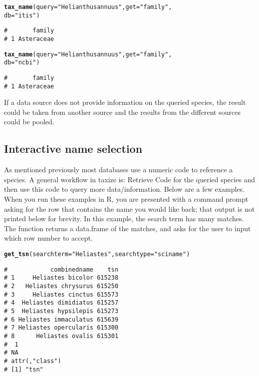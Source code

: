 \documentclass[10pt,a4paper,twocolumn]{article}\usepackage[]{graphicx}\usepackage[]{color}
\makeatletter
\newcommand{\hlstr}[1]{\textcolor[rgb]{0.192,0.494,0.8}{#1}}%
\newcommand{\hlstd}[1]{\textcolor[rgb]{0.345,0.345,0.345}{#1}}%
\newcommand{\hlkwc}[1]{\textcolor[rgb]{0.333,0.667,0.333}{#1}}%
\newcommand{\hlkwd}[1]{\textcolor[rgb]{0.737,0.353,0.396}{\textbf{#1}}}%
\newenvironment{kframe}{%
 \def\at@end@of@kframe{}%
 \ifinner\ifhmode%
  \def\at@end@of@kframe{\end{minipage}}%
  \begin{minipage}{\columnwidth}%
 \fi\fi%
 \def\FrameCommand##1{\hskip\@totalleftmargin \hskip-\fboxsep
 \colorbox{shadecolor}{##1}\hskip-\fboxsep
     \hskip-\linewidth \hskip-\@totalleftmargin \hskip\columnwidth}%
 \MakeFramed {\advance\hsize-\width
   \@totalleftmargin\z@ \linewidth\hsize
   \@setminipage}}%
 {\par\unskip\endMakeFramed%
 \at@end@of@kframe}
\newenvironment{knitrout}{}{} %
\makeatother
\begin{document}
\begin{knitrout}\scriptsize
{}\color{fgcolor}\begin{kframe}
\begin{alltt}
\hlkwd{tax_name}\hlstd{(}\hlkwc{query} \hlstd{=} \hlstr{"Helianthus annuus"}\hlstd{,} \hlkwc{get} \hlstd{=} \hlstr{"family"}\hlstd{,}
         \hlkwc{db} \hlstd{=} \hlstr{"itis"}\hlstd{)}
\end{alltt}
\begin{verbatim}
#       family
# 1 Asteraceae
\end{verbatim}
\begin{alltt}
\hlkwd{tax_name}\hlstd{(}\hlkwc{query} \hlstd{=} \hlstr{"Helianthus annuus"}\hlstd{,} \hlkwc{get} \hlstd{=} \hlstr{"family"}\hlstd{,}
         \hlkwc{db} \hlstd{=} \hlstr{"ncbi"}\hlstd{)}
\end{alltt}
\begin{verbatim}
#       family
# 1 Asteraceae
\end{verbatim}
\end{kframe}
\end{knitrout}


If a data source does not provide information on the queried species, the result could be taken from another source and the results from the different sources could be pooled.

\subsection*{Interactive name selection}
As mentioned previously most databases use a numeric code to reference a species. A general workflow in taxize is: Retrieve Code for the queried species and then use this code to query more data/information. Below are a few examples. When you run these examples in R, you are presented with a command prompt asking for the row that contains the name you would like back; that output is not printed below for brevity. In this example, the search term has many matches. The function returns a data.frame of the matches, and asks for the user to input which row number to accept. 

\begin{knitrout}\scriptsize
{}\color{fgcolor}\begin{kframe}
\begin{alltt}
\hlkwd{get_tsn}\hlstd{(}\hlkwc{searchterm} \hlstd{=} \hlstr{"Heliastes"}\hlstd{,} \hlkwc{searchtype} \hlstd{=} \hlstr{"sciname"}\hlstd{)}
\end{alltt}
\begin{verbatim}
#            combinedname    tsn
# 1     Heliastes bicolor 615238
# 2   Heliastes chrysurus 615250
# 3     Heliastes cinctus 615573
# 4  Heliastes dimidiatus 615257
# 5  Heliastes hypsilepis 615273
# 6 Heliastes immaculatus 615639
# 7 Heliastes opercularis 615300
# 8      Heliastes ovalis 615301
#  1 
# NA 
# attr(,"class")
# [1] "tsn"
\end{verbatim}
\end{kframe}
\end{knitrout}
\end{document}
